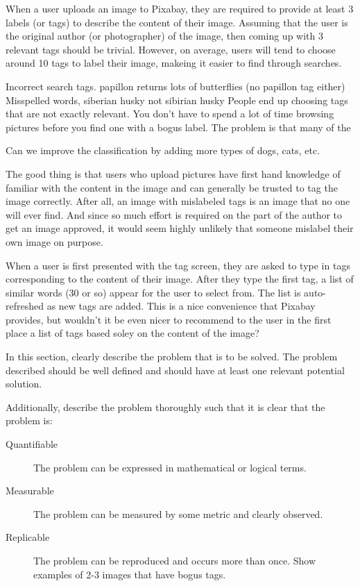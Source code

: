 \documentclass[10pt, a4paper, twocolumn]{article} %
\begin{document}
When a user uploads an image to Pixabay, they are required to provide at least 3 labels (or tags) to describe the content of their image.  Assuming that the user is the original author (or photographer) of the image, then coming up with 3 relevant tags should be trivial.  However, on average, users will tend to choose around 10 tags to label their image, makeing it easier to find through searches.  

Incorrect search tags. papillon returns lots of butterflies (no papillon tag either)
Misspelled words, siberian husky not sibirian husky
People end up choosing tags that are not exactly relevant.
You don't have to spend a lot of time browsing pictures before you find one with a bogus label.
The problem is that many of the 


Can we improve the classification by adding more types of dogs, cats, etc.

The good thing is that users who upload pictures have first hand knowledge of familiar with the content in the image and can generally be trusted to tag the image correctly.  After all, an image with mislabeled tags is an image that no one will ever find. And since so much effort is required on the part of the author to get an image approved, it would seem highly unlikely that someone mislabel their own image on purpose.  

When a user is first presented with the tag screen, they are asked to type in tags corresponding to the content of their image.  After they type the first tag, a list of similar words (30 or so) appear for the user to select from. The list is auto-refreshed as new tags are added.  This is a nice convenience that Pixabay provides, but wouldn't it be even nicer to recommend to the user in the first place a list of tags based soley on the content of the image?  

In this section, clearly describe the problem that is to be solved. The problem described should be well defined and should have at least one relevant potential solution. 

Additionally, describe the problem thoroughly such that it is clear that the problem is:

\begin{description}
	\item[Quantifiable] The problem can be expressed in mathematical or logical terms.
	\item[Measurable] The problem can be measured by some metric and clearly observed.
	\item[Replicable] The problem can be reproduced and occurs more than once. Show examples of 2-3 images that have bogus tags.
\end{description}
\end{document}

